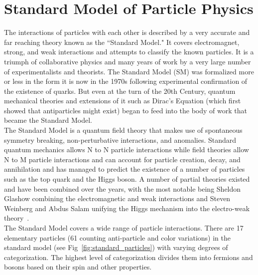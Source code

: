 	\section{Standard Model of Particle Physics}
	The interactions of particles with each other is described by a very accurate and far reaching theory known as the ``Standard Model." It covers electromagnet, strong, and weak  interactions and attempts to classify the known particles. It is a triumph of collaborative physics and many years of work by a very large number of experimentalists and theorists. The Standard Model (SM) was formalized more or less in the form it is now in the 1970s following experimental confirmation of the existence of quarks. But even at the turn of the 20th Century, quantum mechanical theories and extensions of it such as Dirac's Equation (which first showed that antiparticles might exist) began to feed into the body of work that became the Standard Model.\\
	
	The Standard Model is a quantum field theory that makes use of spontaneous symmetry breaking, non-perturbative interactions, and anomalies.  Standard quantum mechanics allows N to N particle interactions while field theories allow N to M particle interactions and can account for particle creation, decay, and annihilation and has managed to predict the existence of a number of particles such as the top quark and the Higgs boson. A number of partial theories existed and have been combined over the years, with the most notable being Sheldon Glashow combining the electromagnetic and weak interactions and Steven Weinberg and Abdus Salam unifying the Higgs mechanism into the electro-weak theory~\cite{halzen}.\\
	
	The Standard Model covers a wide range of particle interactions. There are 17 elementary particles (61 counting anti-particle and color variations) in the standard model (see Fig~\ref{fig:standard_particles}) with varying degrees of categorization. The highest level of categorization divides them into fermions and bosons based on their spin and other properties.
	
